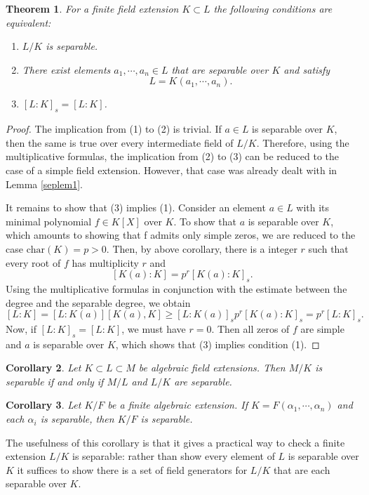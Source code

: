 \documentclass[12pt]{report}
\newtheorem{theorem}{Theorem}[section]
\newtheorem{corollary}[theorem]{Corollary}
\theoremstyle{definition}
\newcommand{\charr}{\text{char}}
\begin{document}
\begin{theorem}
	For a finite field extension $K \subset L$ the following conditions are equivalent: \begin{enumerate}
		\item $L/K$ is separable.
		\item There exist elements $a_1, \cdots, a_n \in L$ that are separable over $K$ and satisfy $$L = K(a_1, \cdots, a_n).$$
		\item $[L : K]_s = [L : K]$.
	\end{enumerate}
\end{theorem}

\begin{proof}
	The implication from (1) to (2) is trivial. If $a \in L$ is separable over $K$, then the same is true over every intermediate field of $L/K$. Therefore, using the multiplicative formulas, the implication from (2) to (3) can be reduced to the case of a simple field extension. However, that case was already dealt with in Lemma \ref{seplem1}.

	It remains to show that (3) implies (1). Consider an element $a \in L$ with its minimal polynomial $f \in K[X]$ over $K$. To show that $a$ is separable over $K$, which amounts to showing that f admits only simple zeros, we are reduced to the case $\charr(K) = p > 0$. Then, by above  corollary, there is a integer $r$ such that every root of $f$ has multiplicity $r$ and
	$$[K(a):K] = p^r[K(a):K]_s.$$
	Using the multiplicative formulas in conjunction with the estimate between the degree and the separable degree, we obtain
	$$[L:K]=[L:K(a)][K(a),K] \geq [L:K(a)]_s p^r [K(a):K]_s= p^r[L:K]_s.$$
	Now, if $[L : K]_s = [L : K]$, we must have $r = 0$. Then all zeros of $f$ are simple and $a$ is separable over $K$, which shows that (3) implies condition (1).
\end{proof}

\begin{corollary}
	Let $K \subset L \subset M$ be algebraic field extensions. Then $M/K$ is separable if and only if $M/L$ and $L/K$ are separable.
\end{corollary}

\begin{corollary}
	Let $K/F$ be a finite algebraic extension. If $K=F(\alpha_1,\cdots,\alpha_n)$ and each $\alpha_i$ is separable, then $K/F$ is separable.
\end{corollary}

The usefulness of this corollary is that it gives a practical way to check a finite extension $L/K$ is separable: rather than show every element of $L$ is separable over $K$ it suffices to show there is a set of field generators for $L/K$ that are each separable over $K$.
\end{document}
